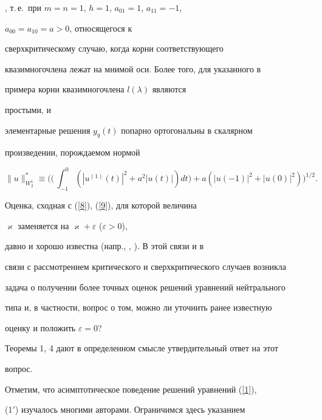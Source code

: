 \cite{12}, т.\,е.~при $m=n=1$, $h=1$, $a_{01}=1$, $a_{11}=-1$, 


$a_{00}=a_{10}=a>0$, относящегося к


сверхкритическому случаю, когда корни соответствующего 


квазимногочлена лежат на мнимой оси. Более того, для указанного в 


\cite{12} примера корни квазимногочлена $l(\lambda)$ являются 


простыми, и 


элементарные решения $y_q(t)$ попарно ортогональны в скалярном 


произведении, порождаемом нормой 


$$ 


\|u\|^*_{W^1_2}\equiv\bigg(\bigg(\,\int^0_{-1} 


(|u^{(1)}(t)|^2+a^2|u(t)|)dt\bigg)+ 


a(|u(-1)|^2+|u(0)|^2)\bigg)^{1/2}. 


$$ 


 


\begin{note} 


Оценка, сходная с (\ref{8}), (\ref{9}), для которой величина 


$\varkappa$ заменяется на $\varkappa+\varepsilon$ ($\varepsilon>0$),


давно и хорошо известна (напр., \cite{4}, \cite{6}). В этой связи и в 


связи с рассмотрением критического и сверхкритического случаев возникла 


задача о получении более точных оценок решений уравнений нейтрального 


типа и, в частности, вопрос о том, можно ли уточнить ранее известную 


оценку и положить $\varepsilon=0$? 


\end{note} 


 


Теоремы 1, 4 дают в определенном смысле утвердительный ответ на этот 


вопрос. 


 


Отметим, что асимптотическое поведение решений уравнений (\ref{1}), 


(1$'$) изучалось многими авторами. Ограничимся здесь указанием 


